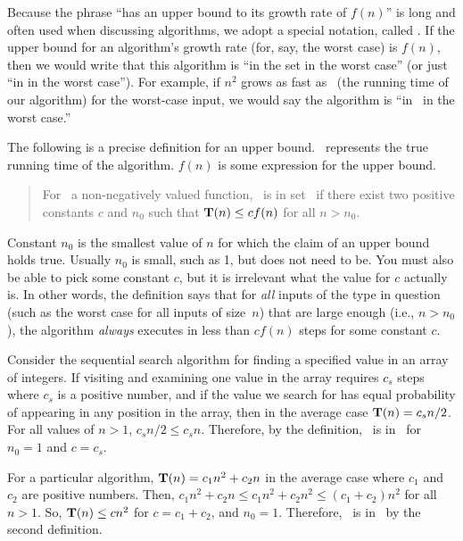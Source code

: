 Because the phrase
``has an upper bound to its growth rate of \(f(n)\)''
is long and often used when discussing algorithms, we adopt a
special notation, called .
If the upper bound for an algorithm's growth rate (for, say, the
worst case) is \(f(n)\), then we would write that this algorithm is
``in the set \Ofn in the worst case''
(or just ``in \Ofn in the worst case'').
For example, if \(n^2\) grows as fast as \Tn\ (the running
time of our algorithm) for the worst-case input,
we would say the algorithm is ``in \Ontwo\ in the worst case.''

The following is a precise definition for an upper bound.
\Tn\ represents the true running time of the algorithm.
\(f(n)\) is some expression for the upper bound.

\begin{quotation}
For \Tn\ a non-negatively valued function,
\Tn\ is in set \Ofn\ if there exist two positive
constants \(c\) and \(n_0\) such that \(\mbox{$\textbf{T}(n)$} \leq cf(n)\) for all
\(n > n_0\).
\end{quotation}

\noindent Constant \(n_0\) is the smallest value of \(n\) for which the
claim of an upper bound holds true.
Usually \(n_0\) is small, such as 1, but does not need to be.
You must also be able to pick some constant \(c\), but it is irrelevant
what the value for \(c\) actually is.
In other words, the definition says that for \emph{all} inputs of the
type in question (such as the worst case for all inputs of size~\(n\))
that are large enough (i.e., \(n > n_0\)), the algorithm \emph{always}
executes in less than \(cf(n)\) steps for some constant \(c\).

\begin{example}
Consider the sequential search algorithm for finding a specified value
in an array of integers.
If visiting and examining one value in the array requires \(c_s\)
steps where \(c_s\) is a positive number,
and if the value we search for has equal probability of appearing in
any position in the array,
then in the average case \(\mbox{$\textbf{T}(n)$} = c_s n/2\).
For all values of \(n > 1\), \( c_s n/2 \leq c_s n\).
Therefore, by the definition, \Tn\ is in \On\ for \(n_0 = 1\) and
\(c = c_s\).
\end{example}

\begin{example}
For a particular algorithm, \(\mbox{$\textbf{T}(n)$} = c_1 n^2 + c_2 n\) in the
average case where \(c_1\) and \(c_2\) are positive numbers.
Then,
\(c_1 n^2 + c_2 n \leq c_1 n^2 + c_2 n^2 \leq (c_1 + c_2)n^2\)
for all \(n > 1\).
So, \(\mbox{$\textbf{T}(n)$} \leq c n^2\) for \(c = c_1 + c_2\), and \(n_0 = 1\).
Therefore, \Tn\ is in \Ontwo\ by the second definition.
\end{example}

